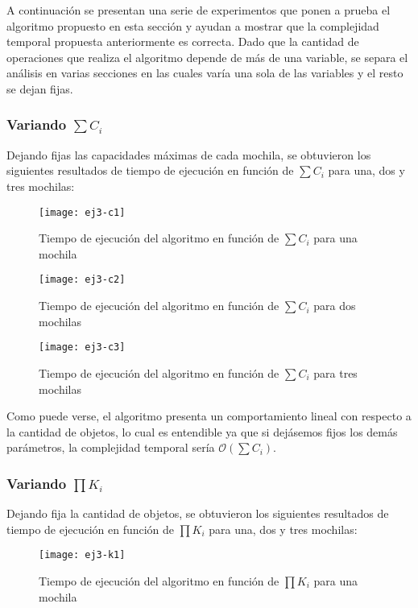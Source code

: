 A continuación se presentan una serie de experimentos que ponen a prueba el algoritmo propuesto en esta sección y ayudan a mostrar que la complejidad temporal propuesta anteriormente es correcta.
Dado que la cantidad de operaciones que realiza el algoritmo depende de más de una variable, se separa el análisis en varias secciones en las cuales varía una sola de las variables y el resto se dejan fijas.

\subsubsection{Variando $\sum C_i$}

Dejando fijas las capacidades máximas de cada mochila, se obtuvieron los siguientes resultados de tiempo de ejecución en función de $\sum C_i$ para una, dos y tres mochilas:

\begin{figure}[H]
		\centering
		\texttt{[image: ej3-c1]}
		\caption{Tiempo de ejecución del algoritmo en función de $\sum C_i$ para una mochila}
	\end{figure}

\begin{figure}[H]
		\centering
		\texttt{[image: ej3-c2]}
		\caption{Tiempo de ejecución del algoritmo en función de $\sum C_i$ para dos mochilas}
	\end{figure}

\begin{figure}[H]
		\centering
		\texttt{[image: ej3-c3]}
		\caption{Tiempo de ejecución del algoritmo en función de $\sum C_i$ para tres mochilas}
	\end{figure}

Como puede verse, el algoritmo presenta un comportamiento lineal con respecto a la cantidad de objetos, lo cual es entendible ya que si dejásemos fijos los demás parámetros, la complejidad temporal sería $\mathcal{O}(\sum C_i)$. %

\subsubsection{Variando $\prod K_i$}

Dejando fija la cantidad de objetos, se obtuvieron los siguientes resultados de tiempo de ejecución en función de $\prod K_i$ para una, dos y tres mochilas:

\begin{figure}[H]
		\centering
		\texttt{[image: ej3-k1]}
		\caption{Tiempo de ejecución del algoritmo en función de $\prod K_i$ para una mochila}
	\end{figure}

